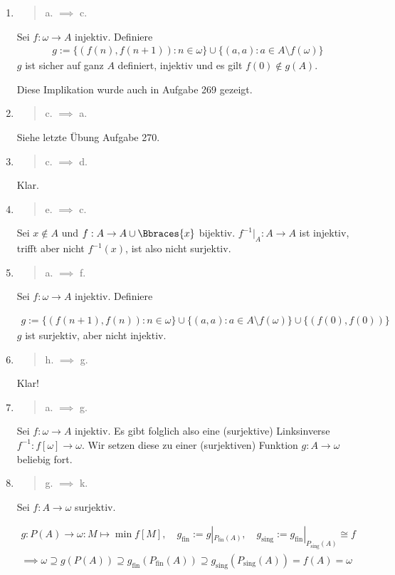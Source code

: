 \begin{solution}
\begin{enumerate}[label = \texttt{ad}]
\begin{enumerate}[label = \arabic*.]
	\end{enumerate}

	\item \blockquote{a. $\implies$ c.}: Sei $f: \omega \to A$ injektiv.
	Definiere
	\begin{align*}
	g := \{(f(n),f(n+1)): n \in \omega\} \cup \{(a,a): a \in A \setminus f(\omega)\}
	\end{align*}
	$g$ ist sicher auf ganz $A$ definiert, injektiv und es gilt $f(0) \notin g(A)$.
	
	Diese Implikation wurde auch in Aufgabe 269 gezeigt.
	
	\item \blockquote{c. $\implies$ a.}: Siehe letzte Übung Aufgabe 270.
	
	\item \blockquote{c. $\implies$ d.}:
	
	Klar.
	
	\item \blockquote{e. $\implies$ c.}:
	
	Sei $x \not \in A$ und $f: A \to A \cup \Bbraces{x}$ bijektiv.
	$f^{-1} |_A: A \to A$ ist injektiv, trifft aber nicht $f^{-1}(x)$, ist also nicht surjektiv.
	
	\item \blockquote{a. $\implies$ f.}: Sei $f: \omega \to A$ injektiv. Definiere
	
	\begin{align*}
	g := \{(f(n+1),f(n)): n \in \omega\} \cup \{(a,a): a \in A \setminus f(\omega)\}
	\cup \{(f(0),f(0))\}
	\end{align*}
	$g$ ist surjektiv, aber nicht injektiv.
	
	\item \blockquote{h. $\implies$ g.}:
	
	Klar!
	
	\item \blockquote{a. $\implies$ g.}:
	
	Sei $f: \omega \to A$ injektiv.
	Es gibt folglich also eine (surjektive) Linksinverse $f^{-1}: f[\omega] \to \omega$.
	Wir setzen diese zu einer (surjektiven) Funktion $g: A \to \omega$ beliebig fort.
	
	\item \blockquote{g. $\implies$ k.}:
	
	Sei $f: A \to \omega$ surjektiv.
	
	\begin{gather*}
	g:
	P(A) \to \omega:
	M \mapsto \min f[M],
	\quad
	g_\mathrm{fin} := g |_{P_\mathrm{fin}(A)},
	\quad
	g_\mathrm{sing} := g_\mathrm{fin} |_{P_\mathrm{sing}(A)} \cong f \\
	\implies
	\omega
	\supseteq
	g(P(A))
	\supseteq
	g_\mathrm{fin}(P_\mathrm{fin}(A))
	\supseteq
	g_\mathrm{sing}(P_\mathrm{sing}(A))
	=
	f(A)
	=
	\omega
	\end{gather*}
	

\end{enumerate}
\end{solution}
